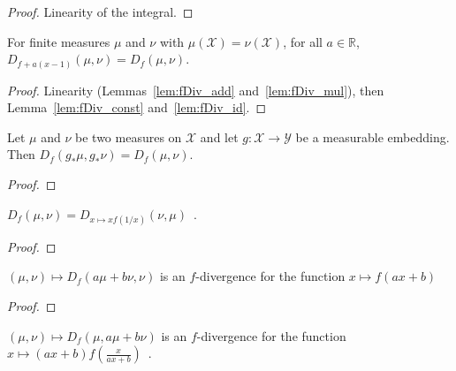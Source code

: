 \begin{proof}\leanok
Linearity of the integral.
\end{proof}

\begin{lemma}
  \label{lem:fDiv_add_linear}
  \leanok
  For finite measures $\mu$ and $\nu$ with $\mu(\mathcal X) = \nu(\mathcal X)$, for all $a \in \mathbb{R}$, $D_{f + a(x - 1)}(\mu, \nu) = D_{f}(\mu, \nu)$.
\end{lemma}

\begin{proof}\leanok
{}
Linearity (Lemmas~\ref{lem:fDiv_add} and~\ref{lem:fDiv_mul}), then Lemma~\ref{lem:fDiv_const} and~\ref{lem:fDiv_id}.
\end{proof}

\begin{lemma}
  \label{lem:fDiv_map_measurableEmbedding}
  \leanok
  Let $\mu$ and $\nu$ be two measures on $\mathcal X$ and let $g : \mathcal X \to \mathcal Y$ be a measurable embedding. Then $D_f(g_* \mu, g_* \nu) = D_f(\mu, \nu)$.
\end{lemma}

\begin{proof}\leanok
\end{proof}


\begin{lemma}
  \label{lem:fDiv_symm}
  $D_f(\mu, \nu) = D_{x \mapsto xf(1/x)}(\nu, \mu)$~.
\end{lemma}

\begin{proof}%
\uses{}

\end{proof}


\begin{lemma}
  \label{lem:fDiv_add_smul_left}
  $(\mu, \nu) \mapsto D_f(a \mu + b \nu, \nu)$ is an $f$-divergence for the function $x \mapsto f(ax + b)$
\end{lemma}

\begin{proof}%
\uses{}
\end{proof}


\begin{lemma}
  \label{lem:fDiv_add_smul_right}
  $(\mu, \nu) \mapsto D_f(\mu, a \mu + b \nu)$ is an $f$-divergence for the function $x \mapsto (ax+b)f\left(\frac{x}{ax+b}\right)$~.
\end{lemma}

